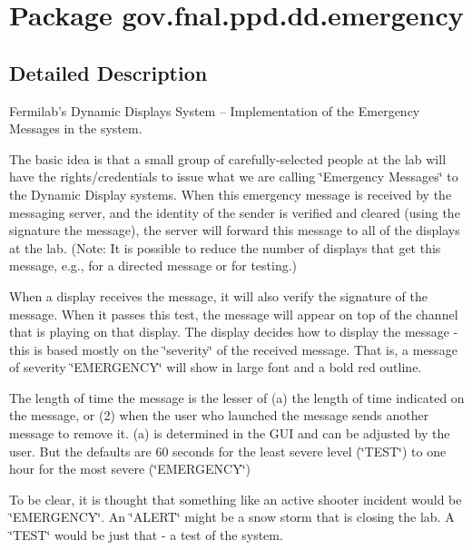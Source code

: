 \hypertarget{namespacegov_1_1fnal_1_1ppd_1_1dd_1_1emergency}{\section{Package gov.\-fnal.\-ppd.\-dd.\-emergency}
\label{namespacegov_1_1fnal_1_1ppd_1_1dd_1_1emergency}
}


\subsection{Detailed Description}
Fermilab's Dynamic Displays System -- Implementation of the Emergency Messages in the system. 

The basic idea is that a small group of carefully-\/selected people at the lab will have the rights/credentials to issue what we are calling \char`\"{}\-Emergency Messages\char`\"{} to the Dynamic Display systems. When this emergency message is received by the messaging server, and the identity of the sender is verified and cleared (using the signature the message), the server will forward this message to all of the displays at the lab. (Note\-: It is possible to reduce the number of displays that get this message, e.\-g., for a directed message or for testing.) 

When a display receives the message, it will also verify the signature of the message. When it passes this test, the message will appear on top of the channel that is playing on that display. The display decides how to display the message -\/ this is based mostly on the \char`\"{}severity\char`\"{} of the received message. That is, a message of severity \char`\"{}\-E\-M\-E\-R\-G\-E\-N\-C\-Y\char`\"{} will show in large font and a bold red outline. 

The length of time the message is the lesser of (a) the length of time indicated on the message, or (2) when the user who launched the message sends another message to remove it. (a) is determined in the G\-U\-I and can be adjusted by the user. But the defaults are 60 seconds for the least severe level (\char`\"{}\-T\-E\-S\-T\char`\"{}) to one hour for the most severe (\char`\"{}\-E\-M\-E\-R\-G\-E\-N\-C\-Y\char`\"{}) 

To be clear, it is thought that something like an active shooter incident would be \char`\"{}\-E\-M\-E\-R\-G\-E\-N\-C\-Y\char`\"{}. An \char`\"{}\-A\-L\-E\-R\-T\char`\"{} might be a snow storm that is closing the lab. A \char`\"{}\-T\-E\-S\-T\char`\"{} would be just that -\/ a test of the system. 

